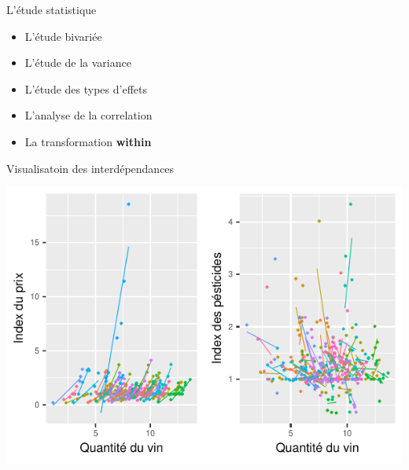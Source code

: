 \documentclass[11pt,ignorenonframetext,]{beamer}
\providecommand{\tightlist}{%
  \setlength{\itemsep}{0pt}\setlength{\parskip}{0pt}}
\begin{document}
\begin{frame}{L'étude statistique}
\protect\hypertarget{letude-statistique-1}{}

\begin{itemize}
\tightlist
\item
  L'étude bivariée
\item
  L'étude de la variance
\item
  L'étude des types d'effets
\item
  L'analyse de la correlation
\item
  La transformation \textbf{within}
\end{itemize}

\end{frame}

\begin{frame}{Visualisatoin des interdépendances}
\protect\hypertarget{visualisatoin-des-interdependances}{}

\tiny

\begin{center}\includegraphics{Presentation_files/figure-beamer/unnamed-chunk-17-1} \end{center}

\normalsize

\end{frame}
\end{document}

